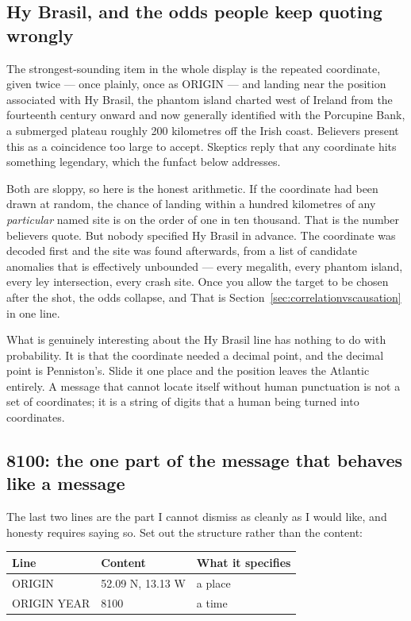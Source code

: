 \subsection*{Hy Brasil, and the odds people keep quoting wrongly}

The strongest-sounding item in the whole display is the repeated coordinate, given twice ---
once plainly, once as ORIGIN --- and landing near the position associated with Hy Brasil, the
phantom island charted west of Ireland from the fourteenth century onward and now generally
identified with the Porcupine Bank, a submerged plateau roughly 200 kilometres off the Irish
coast. Believers present this as a coincidence too large to accept. Skeptics reply that any
coordinate hits something legendary, which the funfact below addresses.

Both are sloppy, so here is the honest arithmetic. If the coordinate had been drawn at random,
the chance of landing within a hundred kilometres of any \emph{particular} named site is on the
order of one in ten thousand. That is the number believers quote. But nobody specified Hy Brasil
in advance. The coordinate was decoded first and the site was found afterwards, from a list of
candidate anomalies that is effectively unbounded --- every megalith, every phantom island,
every ley intersection, every crash site. Once you allow the target to be chosen after the shot,
the odds collapse, and  That is Section~\ref{sec:correlationvscausation} in one line.

What is genuinely interesting about the Hy Brasil line has nothing to do with probability. It is
that the coordinate needed a decimal point, and the decimal point is Penniston's. Slide it one
place and the position leaves the Atlantic entirely. A message that cannot locate itself without
human punctuation is not a set of coordinates; it is a string of digits that a human being turned
into coordinates.

\subsection*{8100: the one part of the message that behaves like a message}

The last two lines are the part I cannot dismiss as cleanly as I would like, and honesty
requires saying so. Set out the structure rather than the content:

\begin{center}\small
\setlength{\tabcolsep}{0.9em}
\begin{tabular}{@{}l l l@{}}
\toprule
\textbf{Line} & \textbf{Content} & \textbf{What it specifies}\\
\midrule
ORIGIN & 52.09 N, 13.13 W & a place\\
ORIGIN YEAR & 8100 & a time\\
\bottomrule
\end{tabular}
\end{center}

